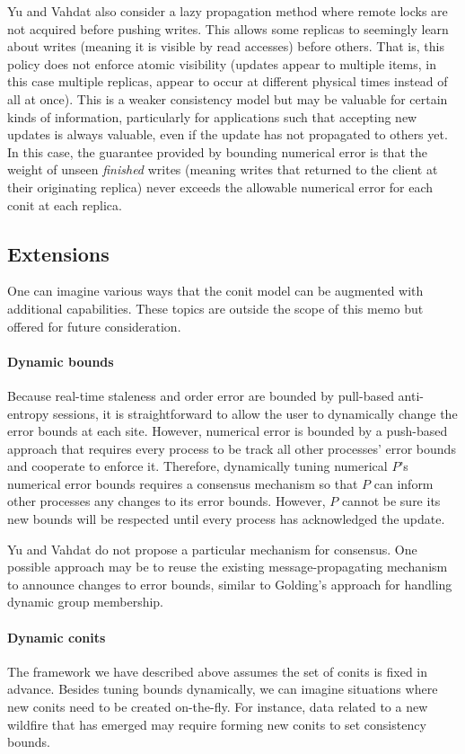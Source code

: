 \documentclass[]             %
{NASA}                       %
\theoremstyle{definition}
\begin{document}
Yu and Vahdat also consider a lazy propagation method where remote
locks are not acquired before pushing writes. This allows some
replicas to seemingly learn about writes (meaning it is visible by
read accesses) before others. That is, this policy does not enforce
atomic visibility (updates appear to multiple items, in this case
multiple replicas, appear to occur at different physical times instead
of all at once). This is a weaker consistency model but may be
valuable for certain kinds of information, particularly for
applications such that accepting new updates is always valuable, even
if the update has not propagated to others yet. In this case, the
guarantee provided by bounding numerical error is that the weight of
unseen \emph{finished} writes (meaning writes that returned to the
client at their originating replica) never exceeds the allowable
numerical error for each conit at each replica.

\subsection{Extensions}
\label{ssec:conit-extensions}
One can imagine various ways that the conit model can be augmented
with additional capabilities. These topics are outside the scope of
this memo but offered for future consideration.

\paragraph{Dynamic bounds}
Because real-time staleness and order error are bounded by pull-based
anti-entropy sessions, it is straightforward to allow the user to
dynamically change the error bounds at each site. However, numerical
error is bounded by a push-based approach that requires every process
to be track all other processes' error bounds and cooperate to enforce
it. Therefore, dynamically tuning numerical $P$'s numerical error
bounds requires a consensus mechanism so that $P$ can inform other
processes any changes to its error bounds. However, $P$ cannot be sure
its new bounds will be respected until every process has acknowledged
the update.

Yu and Vahdat do not propose a particular mechanism for consensus. One
possible approach may be to reuse the existing message-propagating
mechanism to announce changes to error bounds, similar to Golding's
approach for handling dynamic group membership.

\paragraph{Dynamic conits}
The framework we have described above assumes the set of conits is
fixed in advance. Besides tuning bounds dynamically, we can imagine
situations where new conits need to be created on-the-fly. For
instance, data related to a new wildfire that has emerged may require
forming new conits to set consistency bounds.
\end{document}
